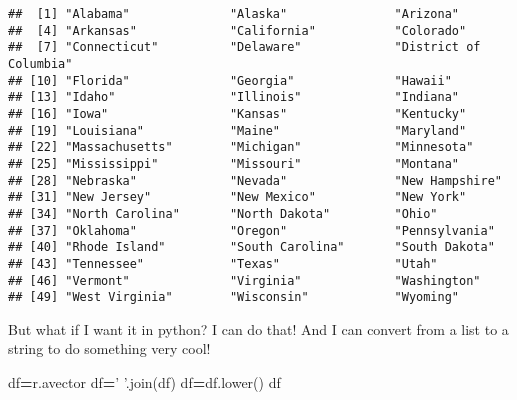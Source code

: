 \documentclass[]{article}
\newenvironment{Shaded}{\begin{snugshade}}{\end{snugshade}}
\newcommand{\DataTypeTok}[1]{\textcolor[rgb]{0.13,0.29,0.53}{#1}}
\newcommand{\DecValTok}[1]{\textcolor[rgb]{0.00,0.00,0.81}{#1}}
\newcommand{\KeywordTok}[1]{\textcolor[rgb]{0.13,0.29,0.53}{\textbf{#1}}}
\newcommand{\NormalTok}[1]{#1}
\newcommand{\OperatorTok}[1]{\textcolor[rgb]{0.81,0.36,0.00}{\textbf{#1}}}
\newcommand{\StringTok}[1]{\textcolor[rgb]{0.31,0.60,0.02}{#1}}
\begin{document}
\begin{Shaded}
\end{Shaded}

\begin{verbatim}
##  [1] "Alabama"              "Alaska"               "Arizona"             
##  [4] "Arkansas"             "California"           "Colorado"            
##  [7] "Connecticut"          "Delaware"             "District of Columbia"
## [10] "Florida"              "Georgia"              "Hawaii"              
## [13] "Idaho"                "Illinois"             "Indiana"             
## [16] "Iowa"                 "Kansas"               "Kentucky"            
## [19] "Louisiana"            "Maine"                "Maryland"            
## [22] "Massachusetts"        "Michigan"             "Minnesota"           
## [25] "Mississippi"          "Missouri"             "Montana"             
## [28] "Nebraska"             "Nevada"               "New Hampshire"       
## [31] "New Jersey"           "New Mexico"           "New York"            
## [34] "North Carolina"       "North Dakota"         "Ohio"                
## [37] "Oklahoma"             "Oregon"               "Pennsylvania"        
## [40] "Rhode Island"         "South Carolina"       "South Dakota"        
## [43] "Tennessee"            "Texas"                "Utah"                
## [46] "Vermont"              "Virginia"             "Washington"          
## [49] "West Virginia"        "Wisconsin"            "Wyoming"
\end{verbatim}

But what if I want it in python? I can do that! And I can convert from a
list to a string to do something very cool!

\begin{Shaded}
\begin{Highlighting}[]
\NormalTok{df}\OperatorTok{=}\NormalTok{r.avector}
\NormalTok{df}\OperatorTok{=}\StringTok{' '}\NormalTok{.join(df)}
\NormalTok{df}\OperatorTok{=}\NormalTok{df.lower()}
\NormalTok{df}
\end{Highlighting}
\end{Shaded}
\end{document}
